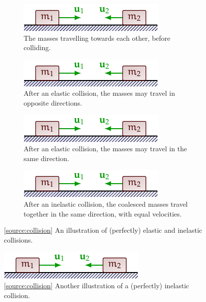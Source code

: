 \documentclass[oneside]{book}
\begin{document}
\begin{figure}[H]
    \centering
    \begin{subfigure}[c]{\textwidth}
        \centering
        \includegraphics[page=1]{../images/collisions/collisions.pdf}
        \caption{The masses travelling towards each other, before colliding.}
    \end{subfigure}%

    \vspace{1em}
    \begin{subfigure}[c]{0.4\textwidth}
        \centering
        \includegraphics[page=2]{../images/collisions/collisions.pdf}
        \caption{After an elastic collision, the masses may travel in opposite directions.}
    \end{subfigure}\hfill
    \begin{subfigure}[c]{0.5\textwidth}
        \centering
        \includegraphics[page=3]{../images/collisions/collisions.pdf}
        \caption{After an elastic collision, the masses may travel in the same direction.}
    \end{subfigure}%

    \vspace{1em}
    \begin{subfigure}[c]{\textwidth}
        \centering
        \includegraphics[page=4]{../images/collisions/collisions.pdf}
        \caption{After an inelastic collision, the coalesced masses travel together in the same direction, with equal velocities.}
    \end{subfigure}%
    \caption{\ref{source:collision} An illustration of (perfectly) elastic and inelastic collisions.}
    \label{fig:collision-1d}
\end{figure}
\begin{figure}[H]
    \centering
    \includegraphics[page=7]{../images/collisions/collisions.pdf}
    \caption{\ref{source:collision} Another illustration of a (perfectly) inelastic collision.}
    \label{fig:collision-2d}
\end{figure}
\end{document}
